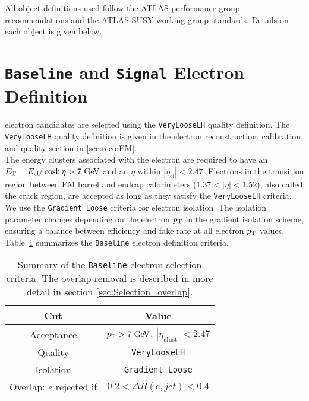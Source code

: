 \indent All object definitions used follow the ATLAS performance group recommendations and the ATLAS SUSY working group standards.  Details on each object is given below.\\%

\section{{\tt Baseline} and {\tt Signal} Electron Definition}  \label{sec:EleDef}

 electron candidates are selected using the {\tt VeryLooseLH} quality definition. The {\tt VeryLooseLH} quality definition is given in the electron reconstruction, calibration and quality section in \ref{sec:reco:EM}. \\

\indent The energy clusters associated with the electron are required to have an $\et = E_{\mathrm{cl}} / \cosh{\eta} > 7 \gev$ and an $\eta$ within $|\eta_{\mathrm{cl}}| < 2.47$. Electrons in the transition region between EM barrel and endcap calorimeters ($1.37 < |\eta| < 1.52$), also called the crack region, are accepted as long as they satisfy the {\tt VeryLooseLH} criteria. \\

\indent We use the {\tt Gradient Loose} criteria for electron isolation. The isolation parameter changes depending on the electron $p_{\mathrm{T}}$ in the gradient isolation scheme, ensuring a balance between efficiency and fake rate at all electron $p_{\mathrm{T}}$ values. \\

\indent Table~\ref{tb:electrons:baseline} summarizes the {\tt Baseline} electron definition criteria.   \\

\begin{table}[h!]
  \caption{Summary of the {\tt Baseline} electron selection criteria. The overlap removal is described in more detail in section \ref{sec:Selection_overlap}.}
  \label{tb:electrons:baseline}
  \begin{center}
    \begin{tabular}{c|c} \hline \hline
      Cut & Value \\ \hline \hline
      Acceptance & $\pT > 7 \gev$, $|\eta_{\mathrm{clust}}| < 2.47$ \\ \hline
      Quality & {\tt VeryLooseLH} \\ \hline
      Isolation & {\tt Gradient Loose} \\ \hline
      Overlap: $e$ rejected if &  $0.2 < \Delta R(e,jet) < 0.4$\\ \hline%
      \hline
    \end{tabular}
      \end{center}
\end{table}%

